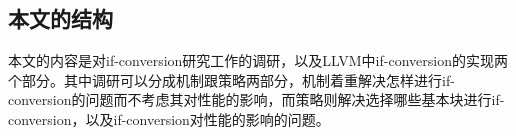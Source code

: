\subsection{本文的结构}

本文的内容是对if-conversion研究工作的调研，以及LLVM中if-conversion的实现两个部分。其中调研可以分成机制跟策略两部分，机制着重解决怎样进行if-conversion的问题而不考虑其对性能的影响，而策略则解决选择哪些基本块进行if-conversion，以及if-conversion对性能的影响的问题。